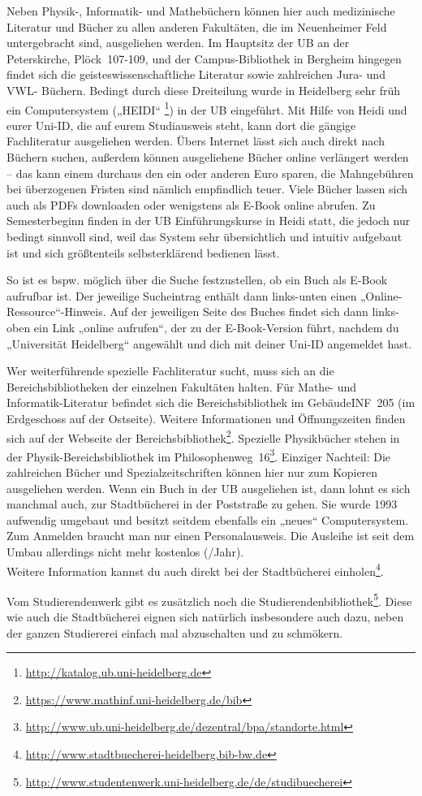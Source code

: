 Neben Physik-, Informatik- und Mathebüchern können hier auch medizinische Literatur und Bücher zu allen anderen Fakultäten, die im Neuenheimer Feld untergebracht sind, ausgeliehen werden. Im Hauptsitz der \gls{UB} an der Peterskirche, Plöck~107-109, und der Campus-Bibliothek in Bergheim hingegen findet sich die geisteswissenschaftliche Literatur sowie zahlreichen Jura- und VWL- Büchern. Bedingt durch diese Dreiteilung wurde in Heidelberg sehr früh ein Computersystem („\gls{HEIDI}“ \footnote{\url{http://katalog.ub.uni-heidelberg.de}}) in der UB eingeführt. Mit Hilfe von Heidi und eurer Uni-ID, die auf eurem Studiausweis steht, kann dort die gängige Fachliteratur ausgeliehen werden. Übers Internet lässt sich auch direkt nach Büchern suchen, außerdem können ausgeliehene Bücher online verlängert werden -- das kann einem durchaus den ein oder anderen Euro sparen, die Mahngebühren bei überzogenen Fristen sind nämlich empfindlich teuer. Viele Bücher lassen sich auch als PDFs downloaden oder wenigstens als E-Book online abrufen. Zu Semesterbeginn finden in der UB Einführungskurse in Heidi statt, die jedoch nur bedingt sinnvoll sind, weil das System sehr übersichtlich und intuitiv aufgebaut ist und sich größtenteils selbsterklärend bedienen lässt.

So ist es bspw. möglich über die Suche festzustellen, ob ein Buch als E-Book aufrufbar ist. Der jeweilige Sucheintrag enthält dann links-unten einen „Online-Ressource“-Hinweis. Auf der jeweiligen Seite des Buches findet sich dann links-oben ein Link „online aufrufen“, der zu der E-Book-Version führt, nachdem du „Universität Heidelberg“ angewählt und dich mit deiner Uni-ID angemeldet hast.  

Wer weiterführende spezielle Fachliteratur sucht, muss sich an die Bereichsbibliotheken der einzelnen Fakultäten halten. Für Mathe- und Informatik-Literatur befindet sich die Bereichsbibliothek im Gebäude\-\gls{INF}~205 (im Erdgeschoss auf der Ostseite). Weitere Informationen und Öffnungszeiten finden sich auf der Webseite der Bereichsbibliothek\footnote{\url{https://www.mathinf.uni-heidelberg.de/bib}}. Spezielle Physikbücher stehen in der Physik-Bereichsbibliothek im Philosophenweg~16\footnote{\url{http://www.ub.uni-heidelberg.de/dezentral/bpa/standorte.html}}. Einziger Nachteil: Die zahlreichen Bücher und Spezialzeitschriften können hier nur zum Kopieren ausgeliehen werden. Wenn ein Buch in der UB ausgeliehen ist, dann lohnt es sich manchmal auch, zur Stadtbücherei in der Poststraße zu gehen. Sie wurde 1993 aufwendig umgebaut und besitzt seitdem ebenfalls ein „neues“ Computersystem. Zum Anmelden braucht man nur einen Personalausweis. Die Ausleihe ist seit dem Umbau allerdings nicht mehr kostenlos (/Jahr).\\ Weitere Information kannst du auch direkt bei der Stadtbücherei einholen\footnote{\url{http://www.stadtbuecherei-heidelberg.bib-bw.de}}.

Vom Studierendenwerk gibt es zusätzlich noch die Studierendenbibliothek\footnote{\url{http://www.studentenwerk.uni-heidelberg.de/de/studibuecherei}}. Diese wie auch die Stadtbücherei eignen sich natürlich insbesondere auch dazu, neben der ganzen Studiererei einfach mal abzuschalten und zu schmökern.
